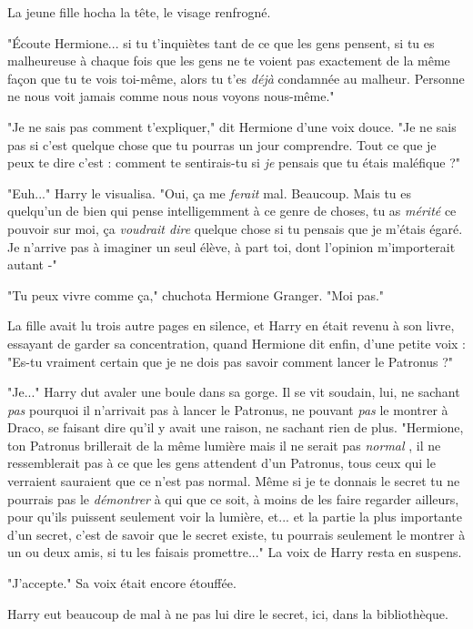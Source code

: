 La jeune fille hocha la tête, le visage renfrogné.

"Écoute Hermione... si tu t'inquiètes tant de ce que les gens pensent, si tu es malheureuse à chaque fois que les gens ne te voient pas exactement de la même façon que tu te vois toi-même, alors tu t'es \emph{déjà}  condamnée au malheur. Personne ne nous voit jamais comme nous nous voyons nous-même."

"Je ne sais pas comment t'expliquer," dit Hermione d'une voix douce. "Je ne sais pas si c'est quelque chose que tu pourras un jour comprendre. Tout ce que je peux te dire c'est : comment te sentirais-tu si \emph{je}  pensais que tu étais maléfique ?"

"Euh..." Harry le visualisa. "Oui, ça me \emph{ferait}  mal. Beaucoup. Mais tu es quelqu'un de bien qui pense intelligemment à ce genre de choses, tu as \emph{mérité}  ce pouvoir sur moi, ça \emph{voudrait dire}  quelque chose si tu pensais que je m'étais égaré. Je n'arrive pas à imaginer un seul élève, à part toi, dont l'opinion m'importerait autant -"

"Tu peux vivre comme ça," chuchota Hermione Granger. "Moi pas."

La fille avait lu trois autre pages en silence, et Harry en était revenu à son livre, essayant de garder sa concentration, quand Hermione dit enfin, d'une petite voix : "Es-tu vraiment certain que je ne dois pas savoir comment lancer le Patronus ?"

"Je..." Harry dut avaler une boule dans sa gorge. Il se vit soudain, lui, ne sachant \emph{pas}  pourquoi il n'arrivait pas à lancer le Patronus, ne pouvant \emph{pas}  le montrer à Draco, se faisant dire qu'il y avait une raison, ne sachant rien de plus. "Hermione, ton Patronus brillerait de la même lumière mais il ne serait pas \emph{normal} , il ne ressemblerait pas à ce que les gens attendent d'un Patronus, tous ceux qui le verraient sauraient que ce n'est pas normal. Même si je te donnais le secret tu ne pourrais pas le \emph{démontrer}  à qui que ce soit, à moins de les faire regarder ailleurs, pour qu'ils puissent seulement voir la lumière, et... et la partie la plus importante d'un secret, c'est de savoir que le secret existe, tu pourrais seulement le montrer à un ou deux amis, si tu les faisais promettre..." La voix de Harry resta en suspens.

"J'accepte." Sa voix était encore étouffée.

Harry eut beaucoup de mal à ne pas lui dire le secret, ici, dans la bibliothèque.

